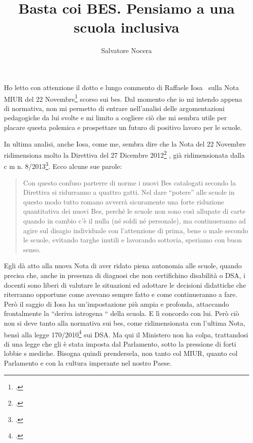 \author{Salvatore Nocera}
\title{Basta coi BES. Pensiamo a una scuola inclusiva}
\label{cha:nocera021213}
\maketitle
{}
Ho letto con attenzione il dotto e lungo commento di Raffaele Iosa~\pageref{cha:Iosa281113} sulla Nota MIUR del 22 Novembre\footcite{Nota_2563_2013} scorso sui bes. Dal momento che io mi intendo appena di normativa, non mi permetto di entrare nell'analisi delle argomentazioni pedagogiche da lui svolte e mi limito a cogliere ciò che mi sembra utile per placare questa polemica e prospettare un futuro di positivo lavoro per le scuole.

In ultima analisi, anche Iosa, come me, sembra dire che la Nota del 22 Novembre ridimensiona molto la Direttiva del 27 Dicembre 2012\footcite{dir27Dic2012} , già ridimensionata dalla c m n. 8/2013\footcite{cm8_2013}. Ecco alcune sue parole:
\begin{quote}
Con questo confuso parterre di norme i nuovi Bes catalogati secondo la Direttiva si ridurranno a quattro gatti. Nel dare “potere” alle scuole in questo modo tutto romano avverrà sicuramente una forte riduzione quantitativa dei nuovi Bes, perché le scuole non sono così allupate di carte quando in cambio c'è il nulla (né soldi né personale), ma continueranno ad agire sul disagio individuale con l'attenzione di prima, bene o male secondo le scuole, evitando targhe inutili e lavorando sottovia, speriamo con buon senso.
\end{quote}
Egli dà atto alla nuova Nota di aver ridato piena autonomia alle scuole, quando precisa che, anche in presenza di diagnosi che non certifichino disabilità o DSA, i docenti sono liberi di valutare le situazioni ed adottare le decisioni didattiche che riterranno opportune come avevano sempre fatto e come continueranno a fare. Però il saggio di Iosa ha un'impostazione più ampia e profonda, attaccando frontalmente la “deriva iatrogena “ della scuola. E lì concordo con lui. Però ciò non si deve tanto alla normativa sui bes, come ridimensionata con l'ultima Nota, bensì alla legge 170/2010\footcite{legge170} sui DSA. Ma qui il Ministero non ha colpa, trattandosi di una legge che gli è stata imposta dal Parlamento, sotto la pressione di forti lobbie s mediche. Bisogna quindi prendersela, non tanto col MIUR, quanto col Parlamento e con la cultura imperante nel nostro Paese.

